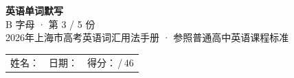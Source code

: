 \documentclass[10pt,a4paper]{article}
\begin{document}
\pagestyle{plain}

\begin{center}
{\LARGE\bfseries 英语单词默写}\\[0.22em]
{\large B 字母 · 第 3 / 5 份}\\[0.18em]
{\small 2026年上海市高考英语词汇用法手册 · 参照普通高中英语课程标准}
\end{center}

\vspace{0.25em}
\noindent\begin{tabular}{@{}p{}@{}p{}@{}p{}@{}}
姓名：\underline{\hspace{2.0cm}} & 日期：\underline{\hspace{2.0cm}} & 得分：\underline{\hspace{1.3cm}}\,/\,46 \\
\end{tabular}

\vspace{0.3em}

\vspace{0.08em}
\end{document}
